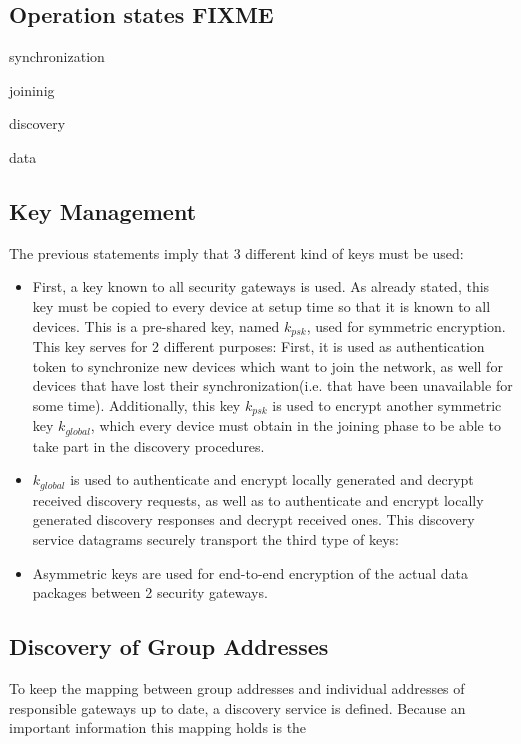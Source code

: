 \subsection{Operation states FIXME}

synchronization

joininig

discovery

data

\subsection{Key Management}

The previous statements imply that 3 different kind of keys must be used:

\begin{itemize}
 \item First, a key known to all security gateways is used. As already stated, this key must be copied to every device at setup time so that it is known
 to all devices. This is a pre-shared key, named $k_{psk}$, used for symmetric encryption. This key serves for 2 different purposes: First, it is used as authentication token to 
 synchronize new devices which want to join the network, as well for devices that have lost their synchronization(i.e. that have been unavailable for some
 time). Additionally, this key $k_{psk}$ is used to encrypt another symmetric key $k_{global}$, which every device must obtain in the joining phase to be 
 able to take part in the discovery procedures. 
 \item $k_{global}$ is used to authenticate and encrypt locally generated and decrypt received discovery requests, as well as to authenticate and encrypt
 locally generated discovery responses and decrypt received ones. This discovery service datagrams securely transport the third type of keys:
 \item Asymmetric keys are used for end-to-end encryption of the actual data packages between 2 security gateways.
\end{itemize}



\subsection{Discovery of Group Addresses}

To keep the mapping between group addresses and individual addresses of responsible gateways up to date, a discovery service is defined. Because an important
information this mapping holds is the 

